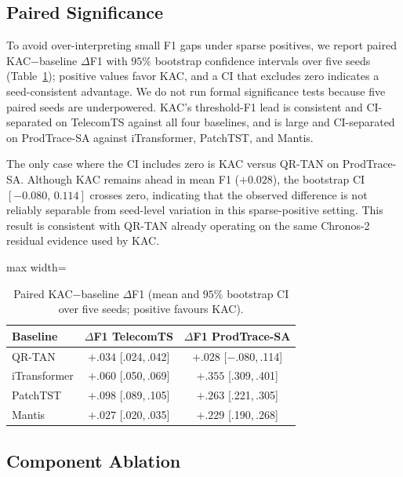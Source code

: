 \documentclass[conference]{IEEEtran}
\begin{document}
\subsection{Paired Significance}
\label{sec:significance}

To avoid over-interpreting small F1 gaps under sparse positives, we report paired KAC$-$baseline $\Delta$F1 with $95\%$ bootstrap confidence intervals over five seeds (Table~\ref{tab:significance}); positive values favor KAC, and a CI that excludes zero indicates a seed-consistent advantage. We do not run formal significance tests because five paired seeds are underpowered. KAC's threshold-F1 lead is consistent and CI-separated on TelecomTS against all four baselines, and is large and CI-separated on ProdTrace-SA against iTransformer, PatchTST, and Mantis.

The only case where the CI includes zero is KAC versus QR-TAN on ProdTrace-SA. Although KAC remains ahead in mean F1 ($+0.028$), the bootstrap CI $[-0.080,\,0.114]$ crosses zero, indicating that the observed difference is not reliably separable from seed-level variation in this sparse-positive setting. This result is consistent with QR-TAN already operating on the same Chronos-2 residual evidence used by KAC.

\begin{table}[t]
  \centering
  \caption{Paired KAC$-$baseline $\Delta$F1 (mean and $95\%$ bootstrap CI over five seeds; positive favours KAC).}
  \label{tab:significance}
  \small
  \setlength{\tabcolsep}{6pt}
  \begin{adjustbox}{max width=\columnwidth}
  \begin{tabular}{@{}lcc@{}}
    \toprule
    \textbf{Baseline} & \textbf{$\Delta$F1 TelecomTS} & \textbf{$\Delta$F1 ProdTrace-SA} \\
    \midrule
    QR-TAN       & $+.034$ [.024,\,.042] & $+.028$ [$-$.080,\,.114] \\
    iTransformer & $+.060$ [.050,\,.069] & $+.355$ [.309,\,.401] \\
    PatchTST     & $+.098$ [.089,\,.105] & $+.263$ [.221,\,.305] \\
    Mantis       & $+.027$ [.020,\,.035] & $+.229$ [.190,\,.268] \\
    \bottomrule
  \end{tabular}
  \end{adjustbox}
\end{table}

\subsection{Component Ablation}
\label{sec:ablation}
\end{document}
